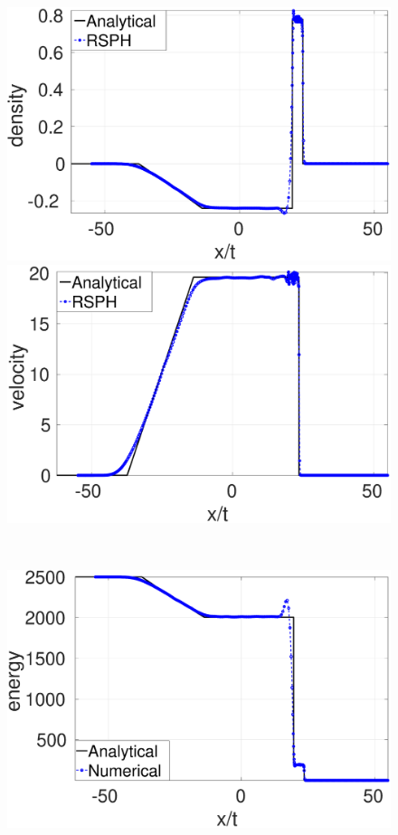 \begin{figure}
    \centering
    \begin{minipage}{.415\textwidth}
        \centering
        \includegraphics[width=0.99 \textwidth]{./Chapter-4/Figures/strong-blast/StrBlst-RCM-rho-Rp3}
    \end{minipage}%
    \begin{minipage}{.415 \textwidth}
        \centering
        \includegraphics[width=0.99 \textwidth]{./Chapter-4/Figures/strong-blast/StrBlst-RCM-v-Rp3}
    \end{minipage}%
    \\
    \begin{minipage}{.415 \textwidth}
        \centering
        \includegraphics[width=0.99 \textwidth]{./Chapter-4/Figures/strong-blast/StrBlst-RCM-e-Rp3}

\end{minipage}
\end{figure}
